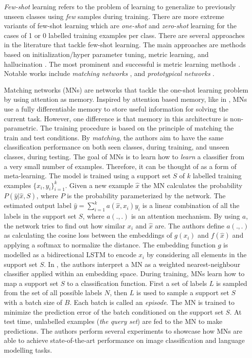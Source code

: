 \documentclass[a4paper,11pt]{article}
\begin{document}
\textit{Few-shot} learning refers to the problem of learning to generalize to previously unseen classes using \textit{few} samples during training. There are more extreme variants of few-shot learning which are \textit{one-shot} and \textit{zero-shot} learning for the cases of 1 or 0 labelled training examples per class. There are several approaches in the literature that tackle few-shot learning. The main approaches are methods based on initialization/hyper parameter tuning, metric learning, and  hallucination \cite{chen2019fewshot}. The most prominent and successful is metric learning methods \cite{ravi2016optimization}. Notable works include \textit{matching networks} \cite{vinyals2016matching}, and \textit{prototypical networks} \cite{snell2017prototypical}. 

Matching networks (MNs) are networks that tackle the one-shot learning problem by using attention as memory. Inspired by attention based memory, like in \cite{bahdanau2016neural}, MNs use a fully differentiable memory to store useful information for solving the current task. However, one difference is that memory in this architecture is non-parametric. The training procedure is based on the principle of matching the train and test conditions. By \textit{matching}, the authors aim to have the same classification performance on both seen classes, during training, and unseen classes, during testing. The goal of MNs is to learn how to \textit{learn} a classifier from a very small number of examples. Therefore, it can be thought of as a form of meta-learning. The model is trained using a support set $S$ of $k$ labelled training examples $\{x_i,y_i\}_{i=1}^k$. Given a new example $\hat{x}$ the MN calculates the probability $P(\hat{y}|\hat{x},S)$, where $P$ is the probability parameterized by the network. The estimated output label $\hat{y} = \sum_{i=1}^k a(\hat{x},x_i)y_i$ is a linear combination of all the labels in the support set $S$, where $a(.,.)$ is an attention mechanism. By using $a$, the network tries to find out how similar $x_i$ and $\hat{x}$ are. The authors define $a(.,.)$ as calculating the cosine loss between the embeddings of $g(x_i)$ and $f(\hat{x})$ and applying a softmax to normalize the distance. The embedding function $g$ is modelled as a bidirectional LSTM to encode $x_i$ by considering all elements in the support set $S$. In \cite{snell2017prototypical}, the authors interpret a MN as a weighted nearest-neighbour classifier applied within an embedding space. During training, MNs learn how to map a support set $S$ to a classification function. First a set of labels $L$ is sampled from the set of all possible labels $N$, then $L$ is used to sample a support set $S$ with a batch size of $B$. Each batch is called an \textit{episode}. The MN is trained to minimize the prediction error of the batch conditioned on the support set $S$. At test time, unlabelled examples (\textit{the query set}) are fed to the MN to make predictions. The authors perform several experiments to showcase how MNs are able to achieve state-of-the-art performance on image classification and language modelling tasks. 
\end{document}
